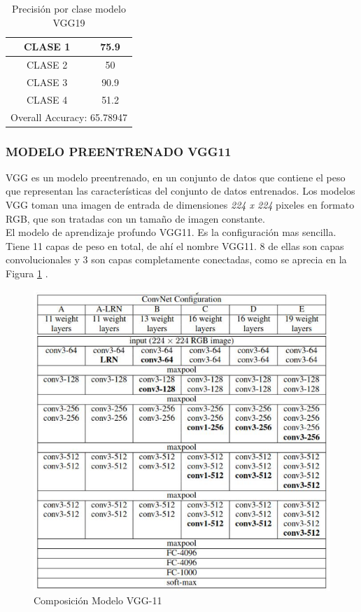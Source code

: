 			\begin{table}[htbp]
				\centering
				\begin{tabular}{|c|c|}
					\hline
					CLASE 1 & 75.9 \bigstrut\\
					\hline
					CLASE 2 & 50 \bigstrut\\
					\hline
					CLASE 3 & 90.9 \bigstrut\\
					\hline
					CLASE 4 & 51.2 \bigstrut\\
					\hline
					\multicolumn{2}{|c|}{Overall Accuracy: 65.78947} \bigstrut\\
					\hline
				\end{tabular}%
				\caption{Precisión por clase modelo VGG19}
				\label{fig:ACU_VGG19}
			\end{table}%
		
		
			\newpage
			\subsubsection{\MakeUppercase{Modelo preentrenado VGG11}}
			VGG es un modelo preentrenado, en un conjunto de datos que contiene el peso que representan las características del conjunto de datos entrenados. Los modelos VGG toman una imagen de entrada de dimensiones \textit{224 x 224} pixeles en formato RGB, que son tratadas con un tamaño de imagen constante.\\
			
			
			 El modelo de aprendizaje profundo VGG11. Es la configuración mas sencilla. Tiene 11 capas de peso en total, de ahí el nombre VGG11. 8 de ellas son capas convolucionales y 3 son capas completamente conectadas, como se aprecia en la Figura \ref{fig:VGG11} \cite{ref_3}.
			
			\begin{figure}[ht]
				\centering
				\includegraphics[scale=0.6]{Figs/70.png}
				\caption{Composición Modelo VGG-11}
				\label{fig:VGG11}
			\end{figure}
		
